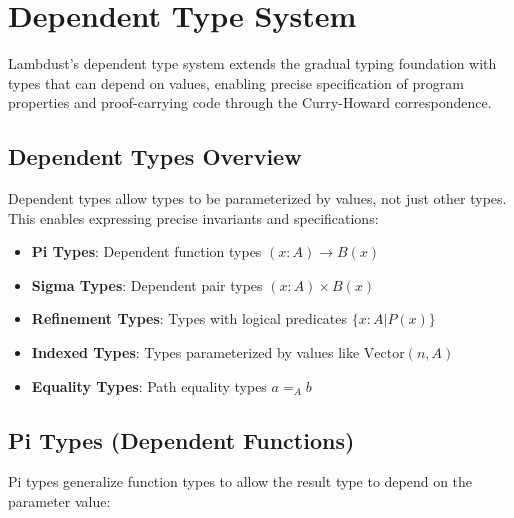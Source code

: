 \chapter{Dependent Type System}
\label{ch:dependent-types}

Lambdust's dependent type system extends the gradual typing foundation with types that can depend on values, enabling precise specification of program properties and proof-carrying code through the Curry-Howard correspondence.

\section{Dependent Types Overview}
\label{sec:dependent-overview}

Dependent types allow types to be parameterized by values, not just other types. This enables expressing precise invariants and specifications:

\begin{itemize}
\item \textbf{Pi Types}: Dependent function types $(x : A) \to B(x)$
\item \textbf{Sigma Types}: Dependent pair types $(x : A) \times B(x)$  
\item \textbf{Refinement Types}: Types with logical predicates $\{x : A | P(x)\}$
\item \textbf{Indexed Types}: Types parameterized by values like $\text{Vector}(n, A)$
\item \textbf{Equality Types}: Path equality types $a =_A b$
\end{itemize}

\section{Pi Types (Dependent Functions)}
\label{sec:pi-types}


Pi types generalize function types to allow the result type to depend on the parameter value:

\begin{grammar}
\end{grammar}

